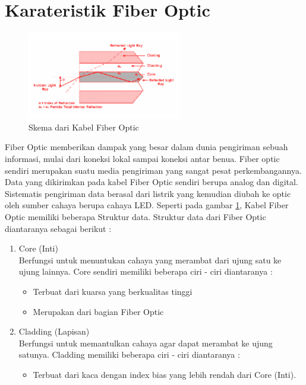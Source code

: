 \section{Karateristik Fiber Optic}
\begin{flushleft}
\begin{figure}[ht]
\centerline{\includegraphics[width=0.6\textwidth]{figures/skemafiber.png}}
\caption{Skema dari Kabel Fiber Optic}
\label{Skema Fiber Optic}
\end{figure}
Fiber Optic memberikan dampak yang besar dalam dunia pengiriman sebuah informasi, mulai dari koneksi lokal sampai koneksi antar benua. Fiber optic sendiri merupakan suatu media pengiriman yang sangat pesat perkembangannya. Data yang dikirimkan pada kabel Fiber Optic sendiri berupa analog dan digital. Sistematis pengiriman data berasal dari listrik yang kemudian diubah ke optic oleh sumber cahaya berupa cahaya LED. Seperti pada gambar \ref{Skema Fiber Optic}, Kabel Fiber Optic memiliki beberapa Struktur data. Struktur data dari Fiber Optic diantaranya sebagai berikut : 
\begin{enumerate}
\item Core (Inti)\\ Berfungsi untuk menuntukan cahaya yang merambat dari ujung satu ke ujung lainnya. Core sendiri memiliki beberapa ciri - ciri diantaranya : \\ 
	\begin{itemize}
	\item Terbuat dari kuarsa yang berkualitas tinggi
	\item Merupakan dari bagian Fiber Optic
	\end{itemize}
\item Cladding (Lapisan)\\ Berfungsi untuk memantulkan cahaya agar dapat merambat ke ujung satunya. Cladding memiliki beberapa ciri - ciri diantaranya : \\
	\begin{itemize}
	\item Terbuat dari kaca dengan index bias yang lebih rendah dari Core (Inti).

\end{itemize}
\end{enumerate}
\end{flushleft}
